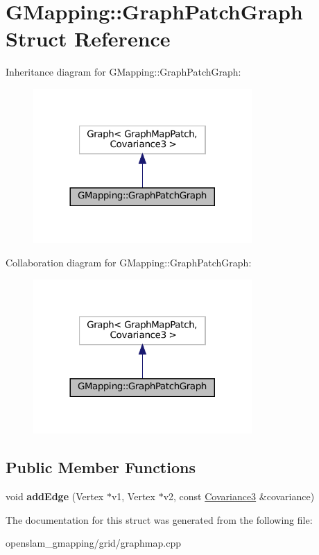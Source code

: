 \hypertarget{structGMapping_1_1GraphPatchGraph}{}\section{G\+Mapping\+:\+:Graph\+Patch\+Graph Struct Reference}
\label{structGMapping_1_1GraphPatchGraph}


Inheritance diagram for G\+Mapping\+:\+:Graph\+Patch\+Graph\+:
\nopagebreak
\begin{figure}[H]
\begin{center}
\leavevmode
\includegraphics[width=236pt]{structGMapping_1_1GraphPatchGraph__inherit__graph}
\end{center}
\end{figure}


Collaboration diagram for G\+Mapping\+:\+:Graph\+Patch\+Graph\+:
\nopagebreak
\begin{figure}[H]
\begin{center}
\leavevmode
\includegraphics[width=236pt]{structGMapping_1_1GraphPatchGraph__coll__graph}
\end{center}
\end{figure}
\subsection*{Public Member Functions}
\begin{DoxyCompactItemize}
\item 
\mbox{\label{structGMapping_1_1GraphPatchGraph_a752ad567bb1d15f3e75ac07bd21ae11e}} 
void {\bfseries add\+Edge} (Vertex $\ast$v1, Vertex $\ast$v2, const \hyperlink{structGMapping_1_1Covariance3}{Covariance3} \&covariance)
\end{DoxyCompactItemize}


The documentation for this struct was generated from the following file\+:\begin{DoxyCompactItemize}
\item 
openslam\+\_\+gmapping/grid/graphmap.\+cpp\end{DoxyCompactItemize}

